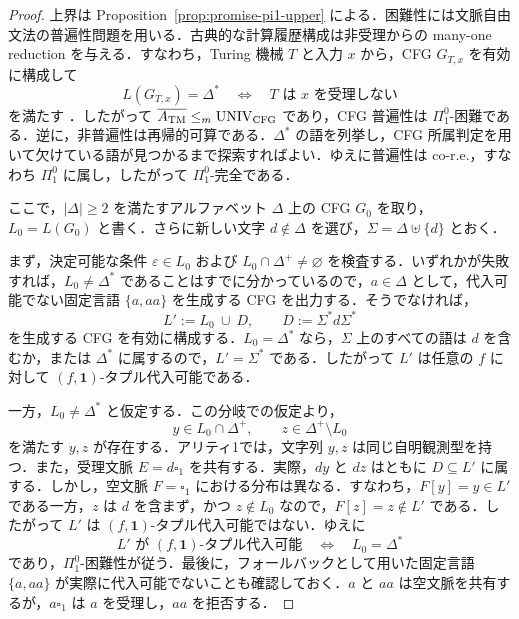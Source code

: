 \documentclass[11pt,a4paper]{ltjsarticle}
\numberwithin{equation}{section}
\theoremstyle{plain}
\theoremstyle{definition}
\theoremstyle{remark}
\newcommand{\blank}{\square}
\newcommand{\eps}{\varepsilon}
\begin{document}
\begin{proof}
上界は Proposition~\ref{prop:promise-pi1-upper} による．困難性には文脈自由文法の普遍性問題を用いる．古典的な計算履歴構成は非受理からの many-one reduction を与える．すなわち，Turing 機械 $T$ と入力 $x$ から，CFG $G_{T,x}$ を有効に構成して
\[
  L(G_{T,x})=\Delta^*
  \quad\Longleftrightarrow\quad
  T\text{ は }x\text{ を受理しない}
\]
を満たす
\cite[p.~281]{HopcroftUllman1979}．したがって
$\overline{A_{\rm TM}}\le_m\mathrm{UNIV}_{\rm CFG}$ であり，CFG 普遍性は $\Pi^0_1$-困難である．逆に，非普遍性は再帰的可算である．$\Delta^*$ の語を列挙し，CFG 所属判定を用いて欠けている語が見つかるまで探索すればよい．ゆえに普遍性は co-r.e.，すなわち $\Pi^0_1$ に属し，したがって $\Pi^0_1$-完全である．

ここで，$|\Delta|\ge2$ を満たすアルファベット $\Delta$ 上の CFG $G_0$ を取り，$L_0=L(G_0)$ と書く．さらに新しい文字 $d\notin\Delta$ を選び，$\Sigma=\Delta\uplus\{d\}$ とおく．

まず，決定可能な条件 $\eps\in L_0$ および
$L_0\cap\Delta^+\ne\varnothing$ を検査する．いずれかが失敗すれば，$L_0\ne\Delta^*$ であることはすでに分かっているので，$a\in\Delta$ として，代入可能でない固定言語 $\{a,aa\}$ を生成する CFG を出力する．そうでなければ，
\[
 L' := L_0\ \cup\ D,
 \qquad
 D:=\Sigma^*d\Sigma^*
\]
を生成する CFG を有効に構成する．$L_0=\Delta^*$ なら，$\Sigma$ 上のすべての語は $d$ を含むか，または $\Delta^*$ に属するので，$L'=\Sigma^*$ である．したがって $L'$ は任意の $f$ に対して $(f,\mathbf1)$-タプル代入可能である．

一方，$L_0\ne\Delta^*$ と仮定する．この分岐での仮定より，
\[
 y\in L_0\cap\Delta^+,
 \qquad
 z\in\Delta^+\setminus L_0
\]
を満たす $y,z$ が存在する．アリティ1では，文字列 $y,z$ は同じ自明観測型を持つ．また，受理文脈 $E=d\blank_1$ を共有する．実際，$dy$ と $dz$ はともに $D\subseteq L'$ に属する．しかし，空文脈 $F=\blank_1$ における分布は異なる．すなわち，$F[y]=y\in L'$ である一方，$z$ は $d$ を含まず，かつ $z\notin L_0$ なので，$F[z]=z\notin L'$ である．したがって $L'$ は $(f,\mathbf1)$-タプル代入可能ではない．ゆえに
\[
 L'\text{ が }(f,\mathbf1)\text{-タプル代入可能}
 \quad\Longleftrightarrow\quad
 L_0=\Delta^*
\]
であり，$\Pi^0_1$-困難性が従う．最後に，フォールバックとして用いた固定言語 $\{a,aa\}$ が実際に代入可能でないことも確認しておく．$a$ と $aa$ は空文脈を共有するが，$a\blank_1$ は $a$ を受理し，$aa$ を拒否する．
\end{proof}

\end{document}
